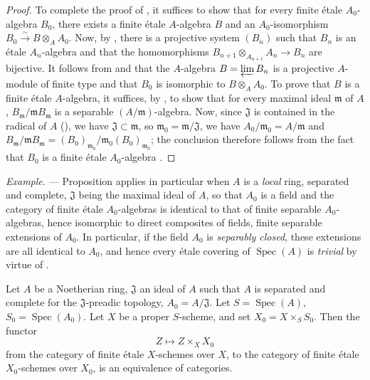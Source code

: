 \begin{proof}
To complete the proof of , it suffices to show that for every finite \'etale $A_0$-algebra $B_0$, there exists a finite \'etale $A$-algebra $B$ and an $A_0$-isomorphism $B_0\xrightarrow{\sim}B\otimes_A A_0$.
Now, by , there is a projective system $(B_n)$ such that $B_n$ is an \'etale $A_n$-algebra and that the homomorphisms $B_{n+1}\otimes_{A_{n+1}}A_n\to B_n$ are bijective.
It follows from  and  that the $A$-algebra $B=\varprojlim B_n$ is a projective $A$-module of finite type and that $B_0$ is isomorphic to $B\otimes_A A_0$.
To prove that $B$ is a finite \'etale $A$-algebra, it suffices, by , to show that for every maximal ideal $\mathfrak{m}$ of $A$, $B_\mathfrak{m}/\mathfrak{m}B_\mathfrak{m}$ is a separable $(A/\mathfrak{m})$-algebra.
Now, since $\mathfrak{J}$ is contained in the radical of $A$ (),
we have $\mathfrak{J}\subset\mathfrak{m}$, so $\mathfrak{m}_0=\mathfrak{m}/\mathfrak{J}$, we have $A_0/\mathfrak{m}_0=A/\mathfrak{m}$ and $B_\mathfrak{m}/\mathfrak{m}B_\mathfrak{m}=(B_0)_{\mathfrak{m}_0}/\mathfrak{m}_0(B_0)_{\mathfrak{m}_0}$;
the conclusion therefore follows from the fact that $B_0$ is a finite \'etale $A_0$-algebra .
\end{proof}

\begin{env}[18.3.3]
\label{IV.18.3.3}
\emph{Example.} ---
Proposition  applies in particular when $A$ is a \emph{local} ring, separated and complete, $\mathfrak{J}$ being the maximal ideal of $A$, so that $A_0$ is a field and the category of finite \'etale $A_0$-algebras is identical to that of finite separable $A_0$-algebras, hence isomorphic to direct composites of fields, finite separable extensions of $A_0$.
In particular, if the field $A_0$ is \emph{separably closed}, these extensions are all identical to $A_0$, and hence every \'etale covering of $\operatorname{Spec}(A)$ is \emph{trivial}  by virtue of .
\end{env}

\begin{theorem}[18.3.4]
\label{IV.18.3.4}
Let $A$ be a Noetherian ring, $\mathfrak{J}$ an ideal of $A$ such that $A$ is separated and complete for the $\mathfrak{J}$-preadic topology, $A_0=A/\mathfrak{J}$.
Let $S=\operatorname{Spec}(A)$, $S_0=\operatorname{Spec}(A_0)$.
Let $X$ be a proper $S$-scheme, and set $X_0=X\times_S S_0$.
Then the functor
\[
Z\mapsto Z\times_X X_0
\]
from the category of finite \'etale $X$-schemes over $X$, to the category of finite \'etale $X_0$-schemes over $X_0$, is an equivalence of categories.
\end{theorem}

